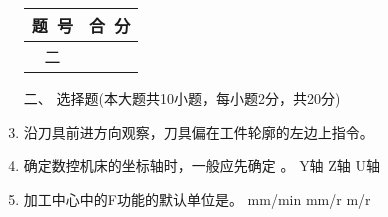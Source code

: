 \documentclass[12pt,twocolumn,landscape,UTF8,twoside]{ctexart}
\begin{document}
\begin{spacing}{1.3}
\begin{enumerate} [1、]
\vspace{0.5cm}

\item[\heiti
\begin{minipage}{\@}	\begin{tabular}{|c|c|}\hline
		题~号 & 合~分\\ \hline		二&       \\\hline	\end{tabular}
\end{minipage} ]

\item[\heiti 二、]{\heiti 选择题(本大题共10小题，每小题2分，共20分)}	
		
\item 沿刀具前进方向观察，刀具偏在工件轮廓的左边上指令。
\item 确定数控机床的坐标轴时，一般应先确定	。
	{Y轴} {Z轴}		{U轴}
\item 加工中心中的F功能的默认单位是。
	{mm/min}	{mm/r}	{m/r}

\end{enumerate}
\end{spacing}
\end{document}
